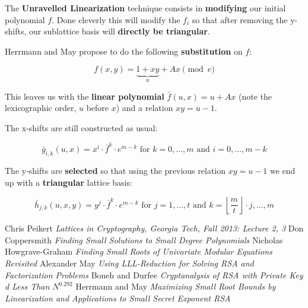 \documentclass[a4paper,11pt]{article}
\begin{document}
The \textbf{Unravelled Linearization} technique consists in \textbf{modifying} our initial polynomial $f$. Done cleverly this will modify the $f_i$ so that after removing the y-shifts, our sublattice basis will \textbf{directly be triangular}.

Herrmann and May propose to do the following \textbf{substitution} on $f$:

\[ f(x,y)=\underbrace{1 + xy}_u + Ax \pmod{e} \]

This leaves us with the \textbf{linear polynomial} $\bar{f}(u, x) = u + Ax$ (note the lexicographic order, $u$ before $x$) and a relation $xy = u - 1$.

The x-shifts are still constructed as usual:

\[ \bar{g}_{i,k}(u,x) = x^i \cdot \bar{f}^k \cdot e^{m-k} \text{ for } k = 0,\hdots,m \text{ and } i=0,\hdots,m-k \]

The y-shifts are \textbf{selected} so that using the previous relation $xy = u - 1$ we end up with a \textbf{triangular} lattice basis:

\[ \bar{h}_{j,k}(u,x,y) = y^j \cdot \bar{f}^k \cdot e^{m-k} \text{ for } j = 1,\hdots,t \text{ and } k=\left\lfloor\frac{m}{t}\right\rfloor\cdot j,\hdots,m \]

\newpage
\begin{thebibliography}{1}

 Chris Peikert {\em Lattices in Cryptography, Georgia Tech, Fall 2013: Lecture 2, 3}
 Don Coppersmith {\em Finding Small Solutions to Small Degree Polynomials}
 Nicholas Howgrave-Graham {\em Finding Small Roots of Univariate Modular Equations Revisited}
 Alexander May {\em Using LLL-Reduction for Solving RSA and Factorization Problems}
 Boneh and Durfee {\em Cryptanalysis of RSA with Private Key d Less Than $N^{0.292}$}
 Herrmann and May {\em Maximizing Small Root Bounds by Linearization and Applications to Small Secret Exponent RSA}


\end{thebibliography}
\end{document}
